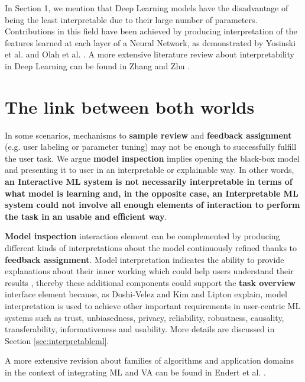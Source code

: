 In Section 1, we mention that Deep Learning models have the disadvantage of being the least interpretable due to their large number of parameters. Contributions in this field have been achieved by producing interpretation of the features learned at each layer of a Neural Network, as demonstrated by Yosinski et al. \cite{Yosinski2015a} and Olah et al. \cite{Olah2018TheInterpretability}. A more extensive literature review about interpretability in Deep Learning can be found in Zhang and Zhu \cite{Zhang2018VisualSurvey}.

\section{The link between both worlds} %
\label{section2.3}

In some scenarios, mechanisms to \textbf{sample review} and \textbf{feedback assignment} (e.g. user labeling or parameter tuning) may not be enough to successfully fulfill the user task. We argue \textbf{model inspection} implies opening the black-box model and presenting it to user in an interpretable or explainable way. In other words, \textbf{an Interactive ML system is not necessarily interpretable in terms of what model is learning and, in the opposite case, an Interpretable ML system could not involve all enough elements of interaction to perform the task in an usable and efficient way}.

\textbf{Model inspection} interaction element can be complemented by producing different kinds of interpretations about the model continuously refined thanks to \textbf{feedback assignment}. Model interpretation indicates the ability to provide explanations about their inner working which could help users understand their results \cite{Doshi-Velez2017c}, thereby these additional components could support the \textbf{task overview} interface element because, as Doshi-Velez and Kim \cite{Doshi-Velez2017c} and Lipton \cite{Lipton2017TheInterpretability} explain, model interpretation is used to achieve other important requirements in user-centric ML systems such as trust, unbiasedness, privacy, reliability, robustness, causality, transferability, informativeness and usability. More details are discussed in Section \ref{sec:interpretableml}.

A more extensive revision about families of algorithms and application domains in the context of integrating ML and VA can be found in Endert et al. \cite{Endert2017b}.
